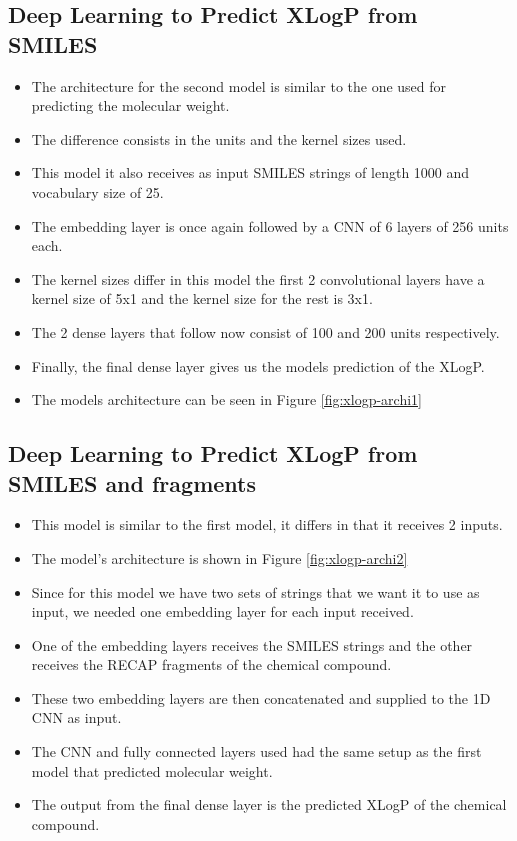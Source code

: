     \subsection{Deep Learning to Predict XLogP from SMILES}
        \begin{itemize}
            \item The architecture for the second model is similar to the one used for predicting the molecular weight.
            \item The difference consists in the units and the kernel sizes used.
            \item This model it also receives as input SMILES strings of length 1000 and vocabulary size of 25.
            \item The embedding layer is once again followed by a CNN of 6 layers of 256 units each.
            \item The kernel sizes differ in this model the first 2 convolutional layers have a kernel size of 5x1 and the kernel size for the rest is 3x1.
            \item The 2 dense layers that follow now consist of 100 and 200 units respectively. 
            \item Finally, the final dense layer gives us the models prediction of the XLogP.
            \item The models architecture can be seen in Figure \ref{fig:xlogp-archi1}
        \end{itemize}
    \subsection{Deep Learning to Predict XLogP from SMILES and fragments}
        \begin{itemize}
            \item This model is similar to the first model, it differs in that it receives 2 inputs. 
            \item The model's architecture is shown in Figure \ref{fig:xlogp-archi2}
            \item Since for this model we have two sets of strings that we want it to use as input, we needed one embedding layer for each input received.
            \item One of the embedding layers receives the SMILES strings and the other receives the RECAP fragments of the chemical compound.
            \item These two embedding layers are then concatenated and supplied to the 1D CNN as input.
            \item The CNN and fully connected layers used had the same setup as the first model that predicted molecular weight.
            \item The output from the final dense layer is the predicted XLogP of the chemical compound.
        \end{itemize}
    
